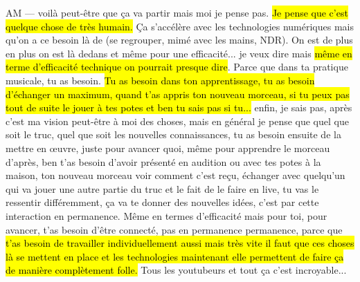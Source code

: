 AM — voilà peut-être que ça va partir mais moi je pense pas. \hl{Je pense que c'est quelque chose de très humain.} Ça s'accélère avec les technologies numériques mais qu'on a ce besoin là de (se regrouper, mimé avec les mains, NDR). On est de plus en plus on est là dedans et même pour une efficacité... je veux dire mais \hl{même en terme d'efficacité technique on pourrait presque dire}. Parce que dans ta pratique musicale, tu as besoin. \hl{Tu as besoin dans ton apprentissage, tu as besoin d'échanger un maximum, quand t'as appris ton nouveau morceau, si tu peux pas tout de suite le jouer à tes potes et ben tu sais pas si tu...} enfin, je sais pas, après c'est ma vision peut-être à moi des choses, mais en général je pense que quel que soit le truc, quel que soit les nouvelles connaissances, tu as besoin ensuite de la mettre en œuvre, juste pour avancer quoi, même pour apprendre le morceau d'après, ben t'as besoin d'avoir présenté en audition ou avec tes potes à la maison, ton nouveau morceau voir comment c'est reçu, échanger avec quelqu'un qui va jouer une autre partie du truc et le fait de le faire en live, tu vas le ressentir différemment, ça va te donner des nouvelles idées, c'est par cette interaction en permanence. Même en termes d'efficacité mais pour toi, pour avancer, t'as besoin d'être connecté, pas en permanence permanence, parce que \hl{t'as besoin de travailler individuellement aussi mais très vite il faut que ces choses là se mettent en place et les technologies maintenant elle permettent de faire ça de manière complètement folle.} Tous les youtubeurs et tout ça c'est incroyable... 

